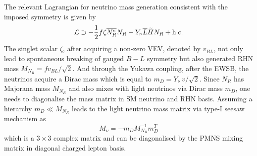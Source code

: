 \documentclass[prd,nofootinbib,preprint,superscriptaddress]{revtex4}
\begin{document}
The relevant Lagrangian for neutrino mass generation consistent with the imposed symmetry is given by
\begin{equation}
\mathcal{L} \supset -\frac{1}{2}f \zeta \overline{N^c_R} N_R - Y_\nu  \overline{L} \widetilde{H} N_R+ {\rm h.c.}
\end{equation}
The singlet scalar $\zeta$, after acquiring a non-zero VEV, denoted by $v_{BL}$, not only lead to spontaneous breaking of gauged $B-L$ symmetry but also generated RHN mass $M_{N_R}= f v_{BL}/\sqrt{2}$. And through the Yukawa coupling, after the EWSB, the neutrinos acquire a Dirac mass which is equal to $m_D = Y_\nu ~{v}/{\sqrt{2}}$. Since $N_R$ has Majorana mass $M_{N_R}$ and also mixes with light neutrinos via Dirac mass $m_D$, one needs to diagonalise the mass matrix in SM neutrino and RHN basis. Assuming a hierarchy $m_D \ll M_{N_R}$ leads to the light neutrino mass matrix via type-I seesaw mechanism as
\begin{equation}
M_\nu = -m_D M^{-1}_{N_R} m^T_D
\end{equation}
which is a $3 \times 3$ complex matrix and can be diagonalised by the PMNS mixing matrix in diagonal charged lepton basis. 
\end{document}

